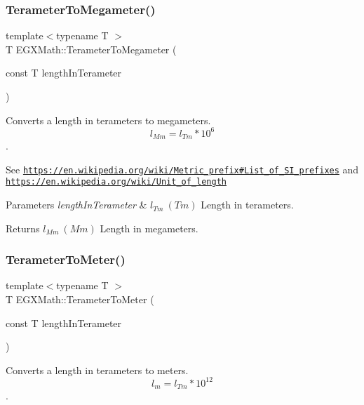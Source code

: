 \subsubsection{\texorpdfstring{Terameter\+To\+Megameter()}{TerameterToMegameter()}}
{\footnotesize\ttfamily template$<$typename T $>$ \\
T E\+G\+X\+Math\+::\+Terameter\+To\+Megameter (\begin{DoxyParamCaption}\item[{const T}]{length\+In\+Terameter }\end{DoxyParamCaption})}



Converts a length in terameters to megameters. \[ l_{Mm}=l_{Tm} * 10^{6} \]. 

See \href{https://en.wikipedia.org/wiki/Metric_prefix#List_of_SI_prefixes}{\tt https\+://en.\+wikipedia.\+org/wiki/\+Metric\+\_\+prefix\#\+List\+\_\+of\+\_\+\+S\+I\+\_\+prefixes} and \href{https://en.wikipedia.org/wiki/Unit_of_length}{\tt https\+://en.\+wikipedia.\+org/wiki/\+Unit\+\_\+of\+\_\+length} 
\begin{DoxyParams}{Parameters}
{\em length\+In\+Terameter} & $ l_{Tm}\ (Tm)$ Length in terameters. \\
\hline
\end{DoxyParams}
\begin{DoxyReturn}{Returns}
$ l_{Mm}\ (Mm)$ Length in megameters. 
\end{DoxyReturn}
\mbox{\label{group___e_g_x_math-_conversions-_length_conversions-_terameter-_s_i_ga34f2674bfcf8fb79eda27adf607d0876}} 
\subsubsection{\texorpdfstring{Terameter\+To\+Meter()}{TerameterToMeter()}}
{\footnotesize\ttfamily template$<$typename T $>$ \\
T E\+G\+X\+Math\+::\+Terameter\+To\+Meter (\begin{DoxyParamCaption}\item[{const T}]{length\+In\+Terameter }\end{DoxyParamCaption})}



Converts a length in terameters to meters. \[ l_{m}=l_{Tm} * 10^{12} \]. 


